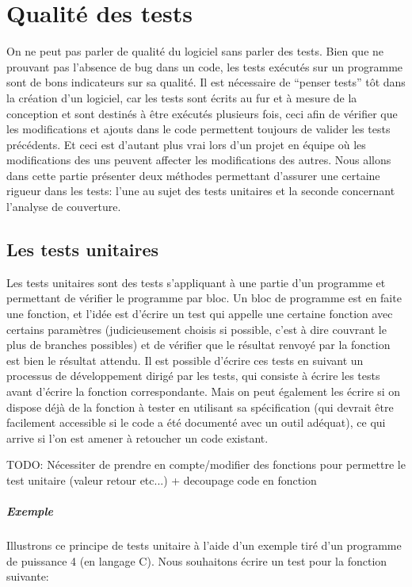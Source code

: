 \documentclass{report}
\begin{document}
\chapter{Qualité des tests}
On ne peut pas parler de qualité du logiciel sans parler des tests. Bien que ne prouvant pas l'absence de bug dans un code, les tests exécutés sur un programme sont de bons indicateurs sur sa qualité. Il est nécessaire de ``penser tests'' tôt dans la création d'un logiciel, car les tests sont écrits au fur et à mesure de la conception et sont destinés à être exécutés plusieurs fois, ceci afin de vérifier que les modifications et ajouts dans le code permettent toujours de valider les tests précédents. Et ceci est d'autant plus vrai lors d'un projet en équipe où les modifications des uns peuvent affecter les modifications des autres. Nous allons dans cette partie présenter deux méthodes permettant d'assurer une certaine rigueur dans les tests: l'une au sujet des tests unitaires et la seconde concernant l'analyse de couverture.
\section{Les tests unitaires}
Les tests unitaires sont des tests s'appliquant à une partie d'un programme et permettant de vérifier le programme par bloc. Un bloc de programme est en faite une fonction, et l'idée est d'écrire un test qui appelle une certaine fonction avec certains paramètres (judicieusement choisis si possible, c'est à dire couvrant le plus de branches possibles) et de vérifier que le résultat renvoyé par la fonction est bien le résultat attendu. Il est possible d'écrire ces tests en suivant un processus de développement dirigé par les tests, qui consiste à écrire les tests avant d'écrire la fonction correspondante. Mais on peut également les écrire si on dispose déjà de la fonction à tester en utilisant sa spécification (qui devrait être facilement accessible si le code a été documenté avec un outil adéquat), ce qui arrive si l'on est amener à retoucher un code existant.

TODO: Nécessiter de prendre en compte/modifier des fonctions pour permettre le test unitaire (valeur retour etc...) + decoupage code en fonction
\paragraph{Exemple}
Illustrons ce principe de tests unitaire à l'aide d'un exemple tiré d'un programme de puissance 4 (en langage C). Nous souhaitons écrire un test pour la fonction suivante:
\end{document}
